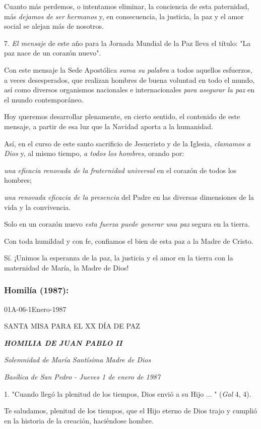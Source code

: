 \begin{body}
Cuanto más perdemos, o intentamos eliminar, la conciencia de esta
paternidad, más \emph{dejamos de ser hermanos} y, en consecuencia, la
justicia, la paz y el amor social se alejan más de nosotros.

7. \emph{El mensaje} de este año para la Jornada Mundial de la Paz lleva
el título: "La paz nace de un corazón nuevo".

Con este mensaje la Sede Apostólica \emph{suma su palabra} a todos
aquellos esfuerzos, a veces desesperados, que realizan hombres de buena
voluntad en todo el mundo, así como diversos organismos nacionales e
internacionales \emph{para asegurar la paz} en el mundo contemporáneo.

Hoy queremos desarrollar plenamente, en cierto sentido, el contenido de
este mensaje, a partir de esa luz que la Navidad aporta a la humanidad.

Así, en el curso de este santo sacrificio de Jesucristo y de la Iglesia,
\emph{clamamos a Dios} y, al mismo tiempo, \emph{a todos los hombres},
orando por:

\emph{una eficacia renovada de la fraternidad universal} en el corazón
de todos los hombres;

\emph{una renovada eficacia de la presencia} del Padre en las diversas
dimensiones de la vida y la convivencia.

Solo en un corazón nuevo \emph{esta fuerza puede generar una paz} segura
en la tierra.

Con toda humildad y con fe, confiamos el bien de esta paz a la Madre de
Cristo.

Sí. ¡Unimos la esperanza de la paz, la justicia y el amor en la tierra
con la maternidad de María, la Madre de Dios!


\subsubsection{Homilía (1987): }
01A-06-1Enero-1987

SANTA MISA PARA EL XX DÍA DE PAZ

\emph{\textbf{HOMILIA DE JUAN PABLO II}}

\emph{Solemnidad de María Santísima Madre de Dios}

\emph{Basílica de San Pedro - Jueves 1 de enero de 1987}

1. "Cuando llegó la plenitud de los tiempos, Dios envió a su Hijo ... "
(\emph{Gal} 4, 4).

Te saludamos, plenitud de los tiempos, que el Hijo eterno de Dios trajo
y cumplió en la historia de la creación, haciéndose hombre.


\end{body}
